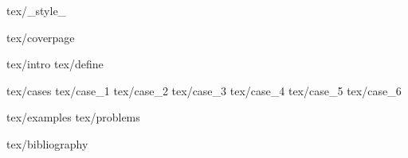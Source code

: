  {tex/_style_}



    \large{}
    
     {tex/coverpage}
    
    \tableofcontents
    
     {tex/intro}
     {tex/define}
    
     {tex/cases}
     {tex/case_1}
     {tex/case_2}
     {tex/case_3}
     {tex/case_4}
     {tex/case_5}
     {tex/case_6}
    
     {tex/examples}
     {tex/problems}
    
     {tex/bibliography}
    
